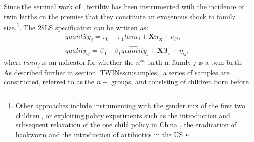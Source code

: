 \documentclass[subeqn]{article}
\begin{document}
\begin{spacing}{1.4}
Since the seminal work of \citep{RosenzweigWolpin1980}, fertility has been instrumented with the incidence of twin 
births on the premise that they constitute an exogenous shock to family size.\footnote{Other approaches include instrumenting with the gender mix of the first two children \citep{AngristEvans1998,ConleyGlauber2006}, or exploiting policy experiments such as the introduction and subsequent relaxation of the one child policy in China
  \citep{Qian2009,ArgysAverett2015}, the eradication of hookworm \citep{BleakleyLange2009} and the introduction of antibiotics in the US \citep{Bhalotraetal2016}}.
The 2SLS specification can be written as:
\begin{subequations}
  \begin{eqnarray}
    \label{TWINeqn:IV1}
    quantity_{j}=\pi_0+\pi_1 twin_{j} + \bm{X}\bm{\pi_x}+\nu_{ij}, \\ \label{TWINeqn:IV2}
    quality_{ij}=\beta_0 + \beta_1 \widehat{quantity}_j + \bm{X}\bm{\beta_x}+\eta_{ij}.
  \end{eqnarray}
\end{subequations}
where $twin_j$ is an indicator for whether the $n^{th}$ birth in family $j$ is a
twin birth. As described further in section \ref{TWINsscn:samples}, a series of samples
are constructed, referred to as the $n+$ groups, and consisting of children born before

\end{spacing}
\end{document}
